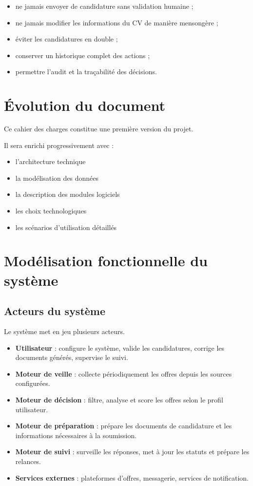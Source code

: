 \documentclass[11pt,a4paper]{article}
\begin{document}
\begin{itemize}
\item ne jamais envoyer de candidature sans validation humaine ;
\item ne jamais modifier les informations du CV de manière mensongère ;
\item éviter les candidatures en double ;
\item conserver un historique complet des actions ;
\item permettre l’audit et la traçabilité des décisions.
\end{itemize}

\section{Évolution du document}

Ce cahier des charges constitue une première version du projet.

Il sera enrichi progressivement avec :

\begin{itemize}
\item l’architecture technique
\item la modélisation des données
\item la description des modules logiciels
\item les choix technologiques
\item les scénarios d’utilisation détaillés
\end{itemize}

\section{Modélisation fonctionnelle du système}

\subsection{Acteurs du système}

Le système met en jeu plusieurs acteurs.

\begin{itemize}
    \item \textbf{Utilisateur} : configure le système, valide les candidatures, corrige les documents générés, supervise le suivi.
    \item \textbf{Moteur de veille} : collecte périodiquement les offres depuis les sources configurées.
    \item \textbf{Moteur de décision} : filtre, analyse et score les offres selon le profil utilisateur.
    \item \textbf{Moteur de préparation} : prépare les documents de candidature et les informations nécessaires à la soumission.
    \item \textbf{Moteur de suivi} : surveille les réponses, met à jour les statuts et prépare les relances.
    \item \textbf{Services externes} : plateformes d’offres, messagerie, services de notification.
\end{itemize}
\end{document}
